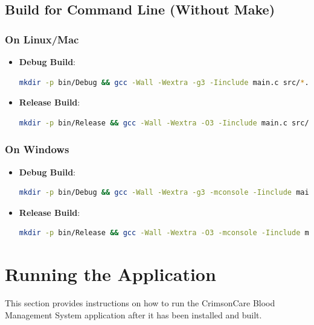 \documentclass[12pt,a4paper]{report}
\begin{document}
\subsection{Build for Command Line (Without Make)}
\subsubsection{On Linux/Mac}
\begin{itemize}
    \item \normalsize \textbf{Debug Build}:
    \begin{lstlisting}[language=Bash, caption=Debug Build Without Make on Linux/Mac]
    mkdir -p bin/Debug && gcc -Wall -Wextra -g3 -Iinclude main.c src/*.c -o bin/Debug/CrimsonCare
    \end{lstlisting}
    \item \normalsize \textbf{Release Build}:
    \begin{lstlisting}[language=Bash, caption=Release Build Without Make on Linux/Mac]
    mkdir -p bin/Release && gcc -Wall -Wextra -O3 -Iinclude main.c src/*.c -o bin/Release/CrimsonCare
    \end{lstlisting}
\end{itemize}

\subsubsection{On Windows}
\begin{itemize}
    \item \normalsize \textbf{Debug Build}:
    \begin{lstlisting}[language=Bash, caption=Debug Build Without Make on Windows]
    mkdir -p bin/Debug && gcc -Wall -Wextra -g3 -mconsole -Iinclude main.c src/*.c -o bin/Debug/CrimsonCare.exe
    \end{lstlisting}
    \item \normalsize \textbf{Release Build}:
    \begin{lstlisting}[language=Bash, caption=Release Build Without Make on Windows]
    mkdir -p bin/Release && gcc -Wall -Wextra -O3 -mconsole -Iinclude main.c src/*.c -o bin/Release/CrimsonCare.exe
    \end{lstlisting}
\end{itemize}

\section{Running the Application}
This section provides instructions on how to run the CrimsonCare Blood Management System application after it has been installed and built.
\end{document}
